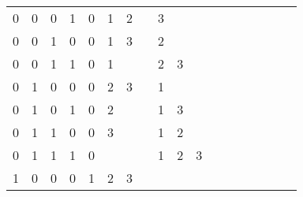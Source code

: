 \begin{table}[]
\begin{minipage}{.4\textwidth}
\begin{tabular}{cccccccccccccccccc}
            \multicolumn{1}{c}{0} & \multicolumn{1}{c}{0} & \multicolumn{1}{c}{0} & \multicolumn{1}{c}{1} & \multicolumn{1}{|c}{0} & \multicolumn{1}{c}{1} & \multicolumn{1}{c}{2}& \multicolumn{1}{c}{} &
            \multicolumn{1}{c}{3} & \multicolumn{1}{c}{} & \multicolumn{1}{c}{}& \multicolumn{1}{c}{} \\
            \multicolumn{1}{c}{0} & \multicolumn{1}{c}{0} & \multicolumn{1}{c}{1} & \multicolumn{1}{c}{0} & \multicolumn{1}{|c}{0} & \multicolumn{1}{c}{1} & \multicolumn{1}{c}{3}& \multicolumn{1}{c}{} &
            \multicolumn{1}{c}{2} & \multicolumn{1}{c}{} & \multicolumn{1}{c}{}& \multicolumn{1}{c}{} \\
            \multicolumn{1}{c}{0} & \multicolumn{1}{c}{0} & \multicolumn{1}{c}{1} & \multicolumn{1}{c}{1} & \multicolumn{1}{|c}{0} & \multicolumn{1}{c}{1} & \multicolumn{1}{c}{}& \multicolumn{1}{c}{} &
            \multicolumn{1}{c}{2} & \multicolumn{1}{c}{3} & \multicolumn{1}{c}{}& \multicolumn{1}{c}{} \\
            \multicolumn{1}{c}{0} & \multicolumn{1}{c}{1} & \multicolumn{1}{c}{0} & \multicolumn{1}{c}{0} & \multicolumn{1}{|c}{0} & \multicolumn{1}{c}{2} & \multicolumn{1}{c}{3}& \multicolumn{1}{c}{} &
            \multicolumn{1}{c}{1} & \multicolumn{1}{c}{} & \multicolumn{1}{c}{}& \multicolumn{1}{c}{} \\
           	\multicolumn{1}{c}{0} & \multicolumn{1}{c}{1} & \multicolumn{1}{c}{0} & \multicolumn{1}{c}{1} & \multicolumn{1}{|c}{0} & \multicolumn{1}{c}{2} & \multicolumn{1}{c}{}& \multicolumn{1}{c}{} &
            \multicolumn{1}{c}{1} & \multicolumn{1}{c}{3} & \multicolumn{1}{c}{}& \multicolumn{1}{c}{} \\
            \multicolumn{1}{c}{0} & \multicolumn{1}{c}{1} & \multicolumn{1}{c}{1} & \multicolumn{1}{c}{0} & \multicolumn{1}{|c}{0} & \multicolumn{1}{c}{3} & \multicolumn{1}{c}{}& \multicolumn{1}{c}{} &
            \multicolumn{1}{c}{1} & \multicolumn{1}{c}{2} & \multicolumn{1}{c}{}& \multicolumn{1}{c}{} \\
            \multicolumn{1}{c}{0} & \multicolumn{1}{c}{1} & \multicolumn{1}{c}{1} & \multicolumn{1}{c}{1} & \multicolumn{1}{|c}{0} & \multicolumn{1}{c}{} & \multicolumn{1}{c}{}& \multicolumn{1}{c}{} &
            \multicolumn{1}{c}{1} & \multicolumn{1}{c}{2} & \multicolumn{1}{c}{3}& \multicolumn{1}{c}{} \\
            \multicolumn{1}{c}{1} & \multicolumn{1}{c}{0} & \multicolumn{1}{c}{0} & \multicolumn{1}{c}{0} & \multicolumn{1}{|c}{1} & \multicolumn{1}{c}{2} & \multicolumn{1}{c}{3}& \multicolumn{1}{c}{} &

\end{tabular}
\end{minipage}
\end{table}
